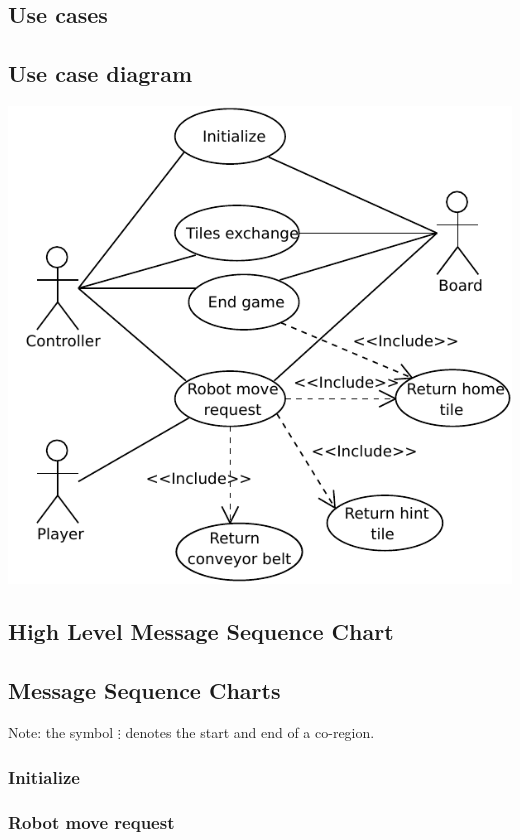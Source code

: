 \subsection{Use cases}
	
\subsection{Use case diagram}
	\includegraphics[width=\linewidth]{usecases/diagram.pdf}	

\subsection{High Level Message Sequence Chart}
    
	
\subsection{Message Sequence Charts}
	Note: the symbol $\vdots$ denotes the start and end of a co-region.

	\subsubsection{Initialize}
  	
    	
	\subsubsection{Robot move request}
	

